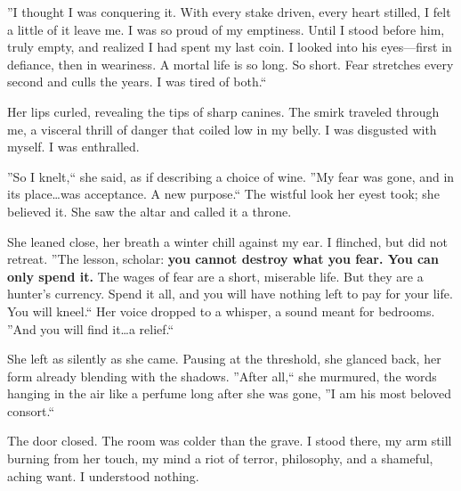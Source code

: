 \documentclass[11pt]{article}
\begin{document}
''I thought I was conquering it. With every stake driven, every heart stilled, I felt a little of it leave me. I was so proud of my emptiness. Until I stood before him, truly empty, and realized I had spent my last coin. I looked into his eyes---first in defiance, then in weariness. A mortal life is so long. So short. Fear stretches every second and culls the years. I was tired of both.``

Her lips curled, revealing the tips of sharp canines. The smirk traveled through me, a visceral thrill of danger that coiled low in my belly. I was disgusted with myself. I was enthralled.

''So I knelt,`` she said, as if describing a choice of wine. ''My fear was gone, and in its place\dots was acceptance. A new purpose.`` The wistful look her eyest took; she believed it. She saw the altar and called it a throne.

She leaned close, her breath a winter chill against my ear. I flinched, but did not retreat. ''The lesson, scholar: \textbf{you cannot destroy what you fear. You can only spend it.} The wages of fear are a short, miserable life. But they are a hunter's currency. Spend it all, and you will have nothing left to pay for your life. You will kneel.`` Her voice dropped to a whisper, a sound meant for bedrooms. ''And you will find it\dots a relief.``

\vspace{0.5em}
\noindent
{}

She left as silently as she came. Pausing at the threshold, she glanced back, her form already blending with the shadows. ''After all,`` she murmured, the words hanging in the air like a perfume long after she was gone, ''I am his most beloved consort.``

The door closed. The room was colder than the grave. I stood there, my arm still burning from her touch, my mind a riot of terror, philosophy, and a shameful, aching want. I understood nothing.

\vspace{0.5em}
\noindent
{}
\end{document}
